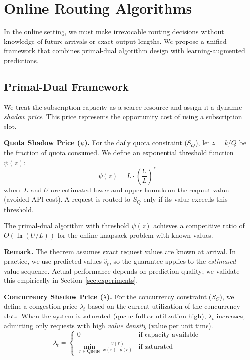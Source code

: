 \section{Online Routing Algorithms}
\label{sec:online}

In the online setting, we must make irrevocable routing decisions without knowledge of future arrivals or exact output lengths. We propose a unified framework that combines primal-dual algorithm design with learning-augmented predictions.

\subsection{Primal-Dual Framework}

We treat the subscription capacity as a scarce resource and assign it a dynamic \textit{shadow price}. This price represents the opportunity cost of using a subscription slot.

\textbf{Quota Shadow Price ($\psi$).}
For the daily quota constraint ($S_Q$), let $z = k/Q$ be the fraction of quota consumed. We define an exponential threshold function $\psi(z)$:
\begin{equation}
    \psi(z) = L \cdot \left( \frac{U}{L} \right)^z
\end{equation}
where $L$ and $U$ are estimated lower and upper bounds on the request value (avoided API cost). A request is routed to $S_Q$ only if its value exceeds this threshold.

\begin{theorem}
The primal-dual algorithm with threshold $\psi(z)$ achieves a competitive ratio of $O(\ln(U/L))$ for the online knapsack problem with known values.
\end{theorem}

\textbf{Remark.} The theorem assumes exact request values are known at arrival. In practice, we use predicted values $\hat{v}_t$, so the guarantee applies to the \emph{estimated} value sequence. Actual performance depends on prediction quality; we validate this empirically in Section~\ref{sec:experiments}.

\textbf{Concurrency Shadow Price ($\lambda$).}
For the concurrency constraint ($S_C$), we define a congestion price $\lambda_t$ based on the current utilization of the concurrency slots. When the system is saturated (queue full or utilization high), $\lambda_t$ increases, admitting only requests with high \textit{value density} (value per unit time).
\begin{equation}
    \lambda_t = \begin{cases}
    0 & \text{if capacity available} \\
    \min_{r \in \text{Queue}} \frac{v(r)}{w(r) \cdot p(r)} & \text{if saturated}
    \end{cases}
\end{equation}

